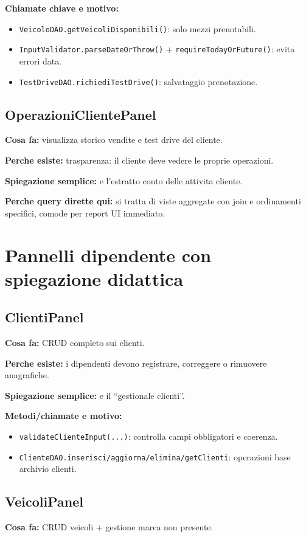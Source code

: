\documentclass[12pt,a4paper]{article}
\begin{document}
\textbf{Chiamate chiave e motivo:}
\begin{itemize}
  \item \texttt{VeicoloDAO.getVeicoliDisponibili()}: solo mezzi prenotabili.
  \item \texttt{InputValidator.parseDateOrThrow()} + \texttt{requireTodayOrFuture()}: evita errori data.
  \item \texttt{TestDriveDAO.richiediTestDrive()}: salvataggio prenotazione.
\end{itemize}

\subsection{OperazioniClientePanel}
\textbf{Cosa fa:} visualizza storico vendite e test drive del cliente.

\textbf{Perche esiste:} trasparenza: il cliente deve vedere le proprie operazioni.

\textbf{Spiegazione semplice:} e l'estratto conto delle attivita cliente.

\textbf{Perche query dirette qui:}
si tratta di viste aggregate con join e ordinamenti specifici, comode per report UI immediato.

\section{Pannelli dipendente con spiegazione didattica}

\subsection{ClientiPanel}
\textbf{Cosa fa:} CRUD completo sui clienti.

\textbf{Perche esiste:} i dipendenti devono registrare, correggere o rimuovere anagrafiche.

\textbf{Spiegazione semplice:} e il ``gestionale clienti''.

\textbf{Metodi/chiamate e motivo:}
\begin{itemize}
  \item \texttt{validateClienteInput(...)}: controlla campi obbligatori e coerenza.
  \item \texttt{ClienteDAO.inserisci/aggiorna/elimina/getClienti}: operazioni base archivio clienti.
\end{itemize}

\subsection{VeicoliPanel}
\textbf{Cosa fa:} CRUD veicoli + gestione marca non presente.
\end{document}
